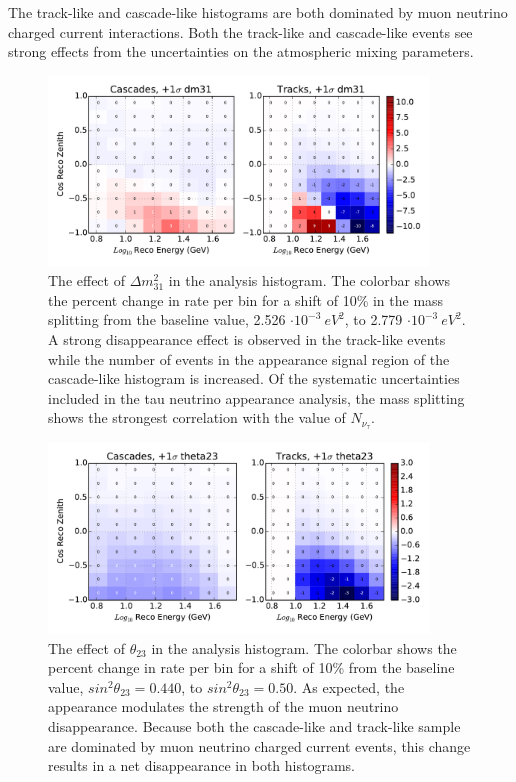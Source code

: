The track-like and cascade-like histograms are both dominated by muon neutrino charged current interactions.
Both the track-like and cascade-like events see strong effects from the uncertainties on the atmospheric mixing parameters.


\begin{figure}
\centering
\includegraphics[width=0.9\textwidth]{systematics/dm31_variation.pdf} 
\caption[Effect of $\Delta m^2_{31}$ in the analysis histogram]{The effect of $\Delta m^2_{31}$ in the analysis histogram. The colorbar shows the percent change in rate per bin for a shift of 10\% in the mass splitting from the baseline value, 2.526 $\cdot 10^{-3}~eV^2$, to 2.779 $\cdot 10^{-3}~eV^2$. A strong disappearance effect is observed in the track-like events while the number of events in the appearance signal region of the cascade-like histogram is increased. Of the systematic uncertainties included in the tau neutrino appearance analysis, the mass splitting shows the strongest correlation with the value of $N_{\nu_\tau}$.}
\label{fig:systematics_dm31}
\end{figure}

\begin{figure}
\centering
\includegraphics[width=0.9\textwidth]{systematics/theta23_variation.pdf} 
\caption[Effect of $\theta{23}$ in the analysis histogram]{The effect of $\theta_{23}$ in the analysis histogram. The colorbar shows the percent change in rate per bin for a shift of 10\% from the baseline value, $sin^2\theta_{23}=0.440$, to $sin^2\theta_{23}=0.50$. As expected, the appearance modulates the strength of the muon neutrino disappearance. Because both the cascade-like and track-like sample are dominated by muon neutrino charged current events, this change results in a net disappearance in both histograms.}
\label{fig:systematics_theta23}
\end{figure}



